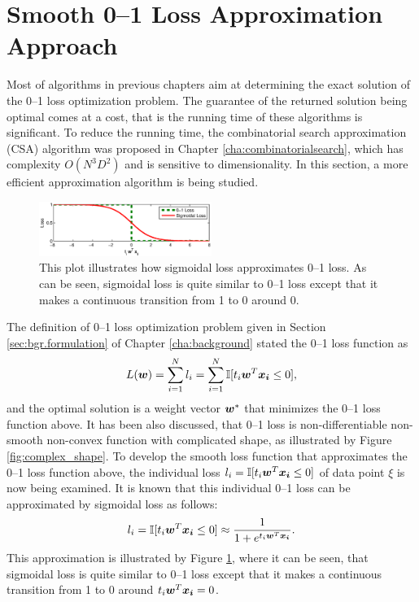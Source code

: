 \section{Smooth 0--1 Loss Approximation Approach}
\label{cha:Smoothlossapprox}

Most of algorithms in previous chapters aim at determining the exact
solution of the 0--1 loss optimization problem. The guarantee of the
returned solution being optimal comes at a cost, that is the running
time of these algorithms is significant. To reduce the running time,
the combinatorial search approximation (CSA) algorithm was proposed in
Chapter \ref{cha:combinatorialsearch}, which has complexity
$O(N^3D^2)$ and is sensitive to dimensionality. In this section, a
more efficient approximation algorithm is being studied.

\begin{figure}[here]
\includegraphics[width=0.50\textwidth]{images/fig51_sigmoid.eps}
\caption{
This plot illustrates how sigmoidal loss approximates 0--1 loss. As can be seen, sigmoidal loss is quite similar to 0--1 loss except that it makes a continuous transition from 1 to 0 around 0.
}
\label{fig:sla.sigmoid}
\end{figure}

The definition of 0--1 loss optimization problem given in Section \ref{sec:bgr.formulation} of Chapter \ref{cha:background} stated the 0--1 loss function as 
$$L(\boldsymbol{w}) = \sum_{i=1}^N l_i = \sum_{i=1}^N \mathbb{I} [t_i \boldsymbol{w}^T \boldsymbol{x_i}
  \leq 0],$$ and the optimal solution is a weight vector $\boldsymbol{w}^*$ that
minimizes the 0--1 loss function above. It has been also discussed,
that 0--1 loss is non-differentiable non-smooth non-convex function
with complicated shape, as illustrated by Figure
\ref{fig:complex_shape}. To develop the smooth loss function that
approximates the 0--1 loss function above, the individual loss $l_i =
\mathbb{I} [t_i \boldsymbol{w}^T \boldsymbol{x_i} \leq 0]$ of data point $\xi$ is now being
examined. It is known that this individual 0--1 loss can be
approximated by sigmoidal loss as follows:
$$l_i = \mathbb{I} [t_i \boldsymbol{w}^T \boldsymbol{x_i} \leq 0] \approx \frac{1}{1 + e^{t_i \boldsymbol{w}^T \boldsymbol{x_i} }}.$$
This approximation is illustrated by Figure \ref{fig:sla.sigmoid}, where it can be seen, that sigmoidal loss is quite similar to 0--1 loss except that it makes a continuous transition from 1 to 0 around $t_i \boldsymbol{w}^T \boldsymbol{x_i} = 0$. 

